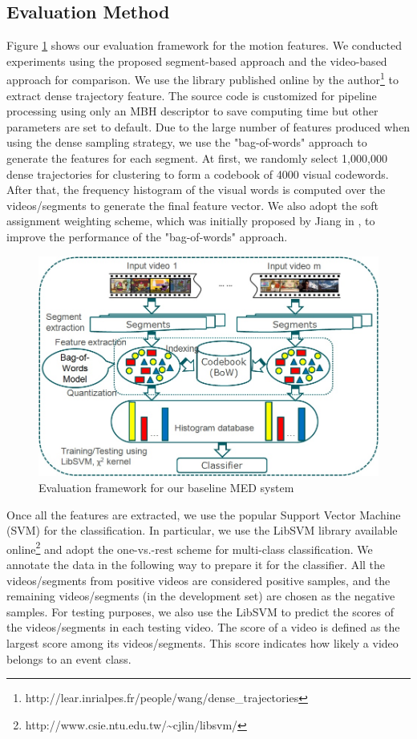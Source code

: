 \subsection{Evaluation Method}
\label{experimentalsetup:2}
%
Figure \ref{framework} shows our evaluation framework for the motion features. We conducted experiments using the proposed segment-based approach and the video-based approach for comparison. We use the library published online by the author\footnote{http://lear.inrialpes.fr/people/wang/dense\_trajectories} to extract dense trajectory feature. The source code is customized for pipeline processing using only an MBH descriptor to save computing time but other parameters are set to default. Due to the large number of features produced when using the dense sampling strategy, we use the "bag-of-words" approach to generate the features for each segment. At first, we randomly select 1,000,000 dense trajectories for clustering to form a codebook of 4000 visual codewords. After that, the frequency histogram of the visual words is computed over the videos/segments to generate the final feature vector. We also adopt the soft assignment weighting scheme, which was initially proposed by Jiang in \cite{Jiang:2007:TOB}, to improve the performance of the "bag-of-words" approach.
\begin{figure}
	\centering
	\includegraphics[width=1\textwidth]{baseline_framework.jpg}
	\caption{Evaluation framework for our baseline MED system}
	\label{framework}
\end{figure}

Once all the features are extracted, we use the popular Support Vector Machine (SVM) for the classification. In particular, we use the LibSVM library available online\footnote{http://www.csie.ntu.edu.tw/{\textasciitilde}cjlin/libsvm/} and adopt the one-vs.-rest scheme for multi-class classification. We annotate the data in the following way to prepare it for the classifier. All the videos/segments from positive videos are considered positive samples, and the remaining videos/segments (in the development set) are chosen as the negative samples. For testing purposes, we also use the LibSVM to predict the scores of the videos/segments in each testing video. The score of a video is defined as the largest score among its videos/segments. This score indicates how likely a video belongs to an event class.

